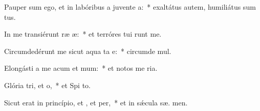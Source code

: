 \item Pauper sum ego, et in labóribus a juvente a:~* exaltátus autem, humiliátus sum  tus.
\item In me transiérunt ræ æ:~* et terróres tui runt me.
\item Circumdedérunt me sicut aqua ta e:~* circumde  mul.
\item Elongásti a me acum et mum:~* et notos me  ria.
\item Glória tri, et o,~* et Spi to.
\item Sicut erat in princípio, et , et per,~* et in sǽcula sæ. men.
